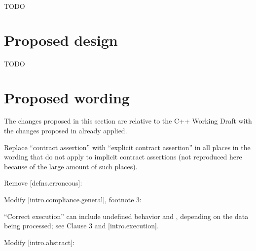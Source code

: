 TODO

\section{Proposed design}

TODO

\section{Proposed wording}

The changes proposed in this section are relative to the C++ Working Draft \cite{N5001} with  the changes proposed in \cite{P2900R13} already applied.

Replace ``contract assertion'' with ``explicit contract assertion'' in all places in the wording that do not apply to implicit contract assertions (not reproduced here because of the large amount of such places).

Remove [defns.erroneous]:

\begin{adjustwidth}{0.5cm}{0.5cm}


\end{adjustwidth}

Modify [intro.compliance.general], footnote 3:

\begin{adjustwidth}{0.5cm}{0.5cm}
“Correct execution” can include undefined behavior and , depending on the data being processed; see Clause 3 and [intro.execution].
\end{adjustwidth}

Modify [intro.abstract]:

